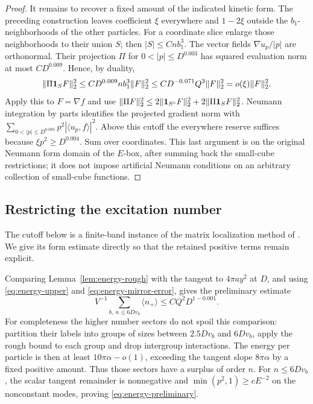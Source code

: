 \begin{proof}
It remains to recover a fixed amount of the indicated kinetic form.
The preceding construction leaves coefficient $\xi$ everywhere and
$1-2\xi$ outside the $b_1$-neighborhoods of the other particles.
For a coordinate slice enlarge those neighborhoods to their union $S$;
then $|S|\le Cnb_1^3$.  The vector fields $\nabla u_p/|p|$ are orthonormal.
Their projection $\Pi$ for $0<|p|\le D^{0.003}$ has squared evaluation
norm at most $CD^{0.009}$.  Hence, by duality,
\[
 \|\Pi\mathbf 1_S F\|_2^2\le CD^{0.009}nb_1^3\|F\|_2^2
                \le CD^{-0.071}Q^3\|F\|_2^2=o(\xi)\|F\|_2^2.
\]
Apply this to $F=\nabla f$ and use
$\|\Pi F\|_2^2\le2\|\mathbf 1_{S^c}F\|_2^2+2\|\Pi\mathbf 1_SF\|_2^2$.
Neumann integration by parts identifies the projected gradient norm
with $\sum_{0<|p|\le D^{0.003}}p^2|\langle u_p,f\rangle|^2$.
Above this cutoff the everywhere reserve suffices because
$\xi p^2\ge D^{0.004}$.  Sum over coordinates.  This last argument is
on the original Neumann form domain of the $E$-box, after summing back
the small-cube restrictions; it does not impose artificial Neumann
conditions on an arbitrary collection of small-cube functions.
\end{proof}

\subsection{Restricting the excitation number}

The cutoff below is a finite-band instance of the matrix localization
method of \cite[Appendix~A]{LiebSolovej}.  We give its form estimate
directly so that the retained positive terms remain explicit.

Comparing Lemma~\ref{lem:energy-rough} with the tangent to
$4\pi ay^2$ at $D$, and using \eqref{eq:energy-upper} and
\eqref{eq:energy-mirror-error}, gives the preliminary estimate
\begin{equation}\label{eq:energy-preliminary}
 V^{-1}\sum_{b,\ n\le6Dv_b}\langle n_+\rangle\le CQ^2D^{1-0.001}.
\end{equation}
For completeness the higher number sectors do not spoil this comparison:
partition their labels into groups of sizes between $2.5Dv_b$ and
$6Dv_b$, apply the rough bound to each group and drop intergroup
interactions.  The energy per particle is then at least
$10\pi\alpha-o(1)$, exceeding the tangent slope $8\pi\alpha$ by a
fixed positive amount.  Thus those sectors have a surplus of order $n$.
For $n\le6Dv_b$, the scalar tangent remainder is nonnegative and
$\min(p^2,1)\ge cE^{-2}$ on the nonconstant modes, proving
\eqref{eq:energy-preliminary}.

